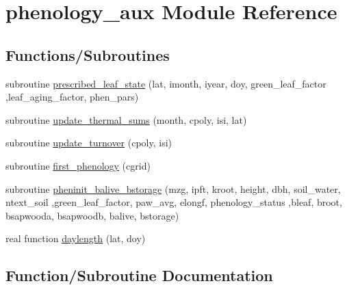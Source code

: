 \hypertarget{namespacephenology__aux}{}\section{phenology\+\_\+aux Module Reference}
\label{namespacephenology__aux}
\subsection*{Functions/\+Subroutines}
\begin{DoxyCompactItemize}
\item 
subroutine \hyperlink{namespacephenology__aux_ac2a698e44f1d2308f845a66ad92600e1}{prescribed\+\_\+leaf\+\_\+state} (lat, imonth, iyear, doy, green\+\_\+leaf\+\_\+factor                                                                                                                                                                                                       ,leaf\+\_\+aging\+\_\+factor, phen\+\_\+pars)
\item 
subroutine \hyperlink{namespacephenology__aux_a227cf46507f7976ea4dd53e724e157c0}{update\+\_\+thermal\+\_\+sums} (month, cpoly, isi, lat)
\item 
subroutine \hyperlink{namespacephenology__aux_a7a199ed988a720b2e56c3b5e1407995a}{update\+\_\+turnover} (cpoly, isi)
\item 
subroutine \hyperlink{namespacephenology__aux_ac9c11ddf83cd16439262bc9c7c72bf2e}{first\+\_\+phenology} (cgrid)
\item 
subroutine \hyperlink{namespacephenology__aux_a678dc0aeea995ed48f816c0588d15965}{pheninit\+\_\+balive\+\_\+bstorage} (mzg, ipft, kroot, height, dbh, soil\+\_\+water, ntext\+\_\+soil                                                                                                                                                                   ,green\+\_\+leaf\+\_\+factor, paw\+\_\+avg, elongf, phenology\+\_\+status                                                                                                                                                           ,bleaf, broot, bsapwooda, bsapwoodb, balive, bstorage)
\item 
real function \hyperlink{namespacephenology__aux_a6fd36340ae7c75f11750adbf09d700d9}{daylength} (lat, doy)
\end{DoxyCompactItemize}


\subsection{Function/\+Subroutine Documentation}
